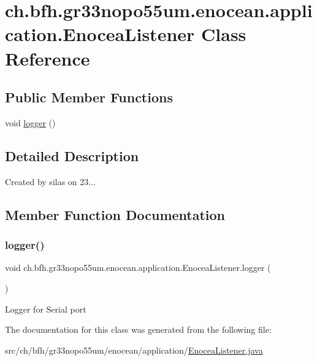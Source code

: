 \hypertarget{classch_1_1bfh_1_1gr33nopo55um_1_1enocean_1_1application_1_1_enocea_listener}{}\section{ch.\+bfh.\+gr33nopo55um.\+enocean.\+application.\+Enocea\+Listener Class Reference}
\label{classch_1_1bfh_1_1gr33nopo55um_1_1enocean_1_1application_1_1_enocea_listener}
\subsection*{Public Member Functions}
\begin{DoxyCompactItemize}
\item 
void \hyperlink{classch_1_1bfh_1_1gr33nopo55um_1_1enocean_1_1application_1_1_enocea_listener_a21f608fec4923768614c6f380c7c6a52}{logger} ()
\end{DoxyCompactItemize}


\subsection{Detailed Description}
Created by silas on 23... 

\subsection{Member Function Documentation}
\hypertarget{classch_1_1bfh_1_1gr33nopo55um_1_1enocean_1_1application_1_1_enocea_listener_a21f608fec4923768614c6f380c7c6a52}{}\label{classch_1_1bfh_1_1gr33nopo55um_1_1enocean_1_1application_1_1_enocea_listener_a21f608fec4923768614c6f380c7c6a52} 
\subsubsection{\texorpdfstring{logger()}{logger()}}
{\footnotesize\ttfamily void ch.\+bfh.\+gr33nopo55um.\+enocean.\+application.\+Enocea\+Listener.\+logger (\begin{DoxyParamCaption}{ }\end{DoxyParamCaption})}

Logger for Serial port 

The documentation for this class was generated from the following file\+:\begin{DoxyCompactItemize}
\item 
src/ch/bfh/gr33nopo55um/enocean/application/\hyperlink{_enocea_listener_8java}{Enocea\+Listener.\+java}\end{DoxyCompactItemize}

